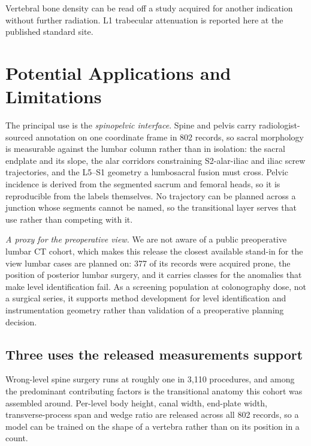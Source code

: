 \documentclass[aapm,mph,amsmath,amssymb,preprint,linenumbers]{revtex4-2}
\begin{document}

Vertebral bone density can be read off a study acquired for another indication without
further radiation.\cite{pickhardt2013} L1 trabecular attenuation is reported here at the
published standard site.

\section{Potential Applications and Limitations}\label{sec:applications}

The principal use is the \emph{spinopelvic interface}. Spine and pelvis carry
radiologist-sourced annotation on one coordinate frame in 802 records, so sacral morphology is
measurable against the lumbar column rather than in isolation: the sacral endplate and its
slope, the alar corridors constraining S2-alar-iliac and iliac screw trajectories, and the
L5--S1 geometry a lumbosacral fusion must cross. Pelvic incidence is derived from the segmented
sacrum and femoral heads, so it is reproducible from the labels themselves. No trajectory can
be planned across a junction whose segments cannot be named, so the transitional layer serves
that use rather than competing with it.

\emph{A proxy for the preoperative view.} We are not aware of a public preoperative lumbar CT
cohort, which makes this release the closest available stand-in for the view lumbar cases are
planned on: 377 of its records were acquired prone, the position of posterior lumbar surgery, and it carries classes for the
anomalies that make level identification fail. As a screening population at colonography
dose, not a surgical series, it supports method development for level identification and
instrumentation geometry rather than validation of a preoperative planning decision.

\subsection{Three uses the released measurements support}

Wrong-level spine surgery runs at roughly one in 3{,}110 procedures, and among the predominant
contributing factors is the transitional anatomy this cohort was assembled
around.\cite{mody2008,epstein2021} Per-level body height, canal width, end-plate width,
transverse-process span and wedge ratio are released across all 802 records, so a model can be
trained on the shape of a vertebra rather than on its position in a count.
\end{document}
